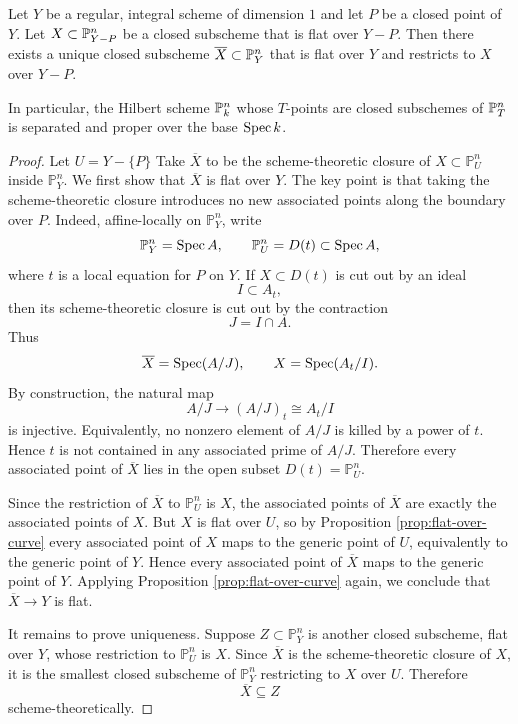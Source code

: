 \documentclass[12pt]{article}
\begin{document}
\begin{proposition}
    Let $Y$ be a regular, integral scheme of dimension $1$ and let $P$ be a closed point of $Y$. Let $X \subset \P^n_{Y-P}$ be a closed subscheme that is flat over $Y-P$. Then there exists a unique closed subscheme $\overline{X} \subset \P^n_Y$ that is flat over $Y$ and restricts to $X$ over $Y-P$.
\end{proposition}

In particular, the Hilbert scheme $\P^n_k$ whose $T$-points are closed subschemes of $\P^n_T$ is separated and proper over the base $\Spec k$.
\begin{proof}
    Let $U=Y-\{P\}$
    Take $\overline X$ to be the scheme-theoretic closure of $X\subset \mathbb P^n_U$ inside $\mathbb P^n_Y$. We first show that $\overline X$ is flat over $Y$. The key point is that taking the scheme-theoretic closure introduces no new associated points along the boundary over $P$. Indeed, affine-locally on $\mathbb P^n_Y$, write
    \[
        \mathbb P^n_Y=\Spec A,
        \qquad
        \mathbb P^n_U=D(t)\subset \Spec A,
    \]
    where $t$ is a local equation for $P$ on $Y$. If $X\subset D(t)$ is cut out by an ideal
    \[
        I\subset A_t,
    \]
    then its scheme-theoretic closure is cut out by the contraction
    \[
        J=I\cap A.
    \]
    Thus
    \[
        \overline X=\Spec(A/J),
        \qquad
        X=\Spec(A_t/I).
    \]
    By construction, the natural map
    \[
        A/J \longrightarrow (A/J)_t\cong A_t/I
    \]
    is injective. Equivalently, no nonzero element of $A/J$ is killed by a power of $t$. Hence $t$ is not contained in any associated prime of $A/J$. Therefore every associated point of $\overline X$ lies in the open subset $D(t)=\mathbb P^n_U$.

    Since the restriction of $\overline X$ to $\mathbb P^n_U$ is $X$, the associated points of $\overline X$ are exactly the associated points of $X$. But $X$ is flat over $U$, so by Proposition \ref{prop:flat-over-curve} every associated point of $X$ maps to the generic point of $U$, equivalently to the generic point of $Y$. Hence every associated point of $\overline X$ maps to the generic point of $Y$. Applying Proposition \ref{prop:flat-over-curve} again, we conclude that
    $\overline X \to Y$ is flat.

    It remains to prove uniqueness. Suppose $Z\subset \mathbb P^n_Y$
    is another closed subscheme, flat over $Y$, whose restriction to $\mathbb P^n_U$ is $X$. Since $\overline X$ is the scheme-theoretic closure of $X$, it is the smallest closed subscheme of $\mathbb P^n_Y$ restricting to $X$ over $U$. Therefore
    \[
        \overline X\subseteq Z
    \]
    scheme-theoretically.


\end{proof}
\end{document}
